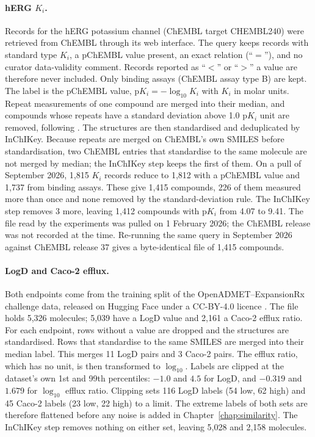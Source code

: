 \paragraph{\texorpdfstring{hERG $K_i$.}{hERG Ki.}} Records for the hERG potassium channel (ChEMBL target CHEMBL240) were retrieved from ChEMBL \citep{Zdrazil2023} through its web interface. The query keeps records with standard type $K_i$, a pChEMBL value present, an exact relation (``$=$''), and no curator data-validity comment. Records reported as ``$<$'' or ``$>$'' a value are therefore never included. Only binding assays (ChEMBL assay type B) are kept. The label is the pChEMBL value, $\mathrm{p}K_i = -\log_{10} K_i$ with $K_i$ in molar units. Repeat measurements of one compound are merged into their median, and compounds whose repeats have a standard deviation above 1.0 p$K_i$ unit are removed, following \citet{landrum2024}. The structures are then standardised and deduplicated by InChIKey. Because repeats are merged on ChEMBL's own SMILES before standardisation, two ChEMBL entries that standardise to the same molecule are not merged by median; the InChIKey step keeps the first of them. On a pull of September 2026, 1,815 $K_i$ records reduce to 1,812 with a pChEMBL value and 1,737 from binding assays. These give 1,415 compounds, 226 of them measured more than once and none removed by the standard-deviation rule. The InChIKey step removes 3 more, leaving 1,412 compounds with p$K_i$ from 4.07 to 9.41. The file read by the experiments was pulled on 1 February 2026; the ChEMBL release was not recorded at the time. Re-running the same query in September 2026 against ChEMBL release 37 gives a byte-identical file of 1,415 compounds.

\paragraph{LogD and Caco-2 efflux.} Both endpoints come from the training split of the OpenADMET--ExpansionRx challenge data, released on Hugging Face under a CC-BY-4.0 licence \citep{openadmet}. The file holds 5,326 molecules; 5,039 have a LogD value and 2,161 a Caco-2 efflux ratio. For each endpoint, rows without a value are dropped and the structures are standardised. Rows that standardise to the same SMILES are merged into their median label. This merges 11 LogD pairs and 3 Caco-2 pairs. The efflux ratio, which has no unit, is then transformed to $\log_{10}$. Labels are clipped at the dataset's own 1st and 99th percentiles: $-1.0$ and $4.5$ for LogD, and $-0.319$ and $1.679$ for $\log_{10}$ efflux ratio. Clipping sets 116 LogD labels (54 low, 62 high) and 45 Caco-2 labels (23 low, 22 high) to a limit. The extreme labels of both sets are therefore flattened before any noise is added in Chapter~\ref{chap:similarity}. The InChIKey step removes nothing on either set, leaving 5,028 and 2,158 molecules.

